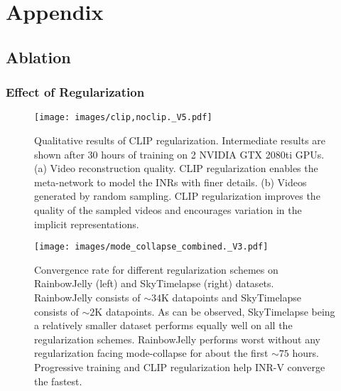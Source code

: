 \documentclass[10pt]{article} \usepackage[accepted]{tmlr}
\begin{document}



\appendix
\section{Appendix}

\subsection{Ablation}

\subsubsection{Effect of Regularization}
\label{sec:ablation-appendix}

\begin{figure}[h]
  \centering
  \texttt{[image: images/clip,noclip.\_V5.pdf]}
  \caption{Qualitative results of CLIP regularization. Intermediate results are shown after $30$ hours of training on 2 NVIDIA GTX 2080ti GPUs. (a) Video reconstruction quality. CLIP regularization enables the meta-network to model the INRs with finer details. (b) Videos generated by random sampling. CLIP regularization improves the quality of the sampled videos and encourages variation in the implicit representations.}
  \label{fig:clipnoclip}
\end{figure}

\begin{figure}[h!]
  \centering
  \texttt{[image: images/mode\_collapse\_combined.\_V3.pdf]}
  \caption {Convergence rate for different regularization schemes on RainbowJelly (left) and SkyTimelapse (right) datasets. RainbowJelly consists of $\sim34$K datapoints and SkyTimelapse consists of $\sim2$K datapoints. As can be observed, SkyTimelapse being a relatively smaller dataset performs equally well on all the regularization schemes. RainbowJelly performs worst without any regularization facing mode-collapse for about the first $\sim75$ hours. Progressive training and CLIP regularization help INR-V converge the fastest.}
  \label{fig:skyrainbowcompletegraph}
\end{figure}
\end{document}
